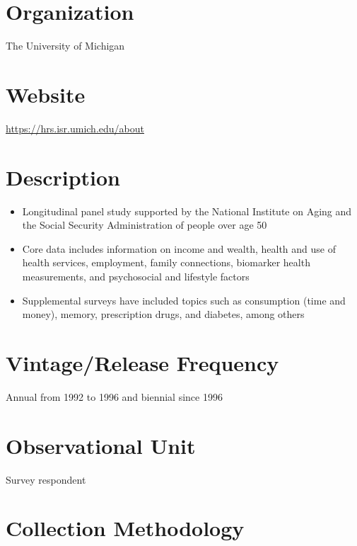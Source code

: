\documentclass[
]{book}
\providecommand{\tightlist}{%
  \setlength{\itemsep}{0pt}\setlength{\parskip}{0pt}}
\begin{document}
\hypertarget{organization-29}{%
\section{Organization}\label{organization-29}}

The University of Michigan

\hypertarget{website-29}{%
\section{Website}\label{website-29}}

\url{https://hrs.isr.umich.edu/about}

\hypertarget{description-29}{%
\section{Description}\label{description-29}}

\begin{itemize}
\tightlist
\item
  Longitudinal panel study supported by the National Institute on Aging and the Social Security Administration of people over age 50
\item
  Core data includes information on income and wealth, health and use of health services, employment, family connections, biomarker health measurements, and psychosocial and lifestyle factors
\item
  Supplemental surveys have included topics such as consumption (time and money), memory, prescription drugs, and diabetes, among others
\end{itemize}

\hypertarget{vintagerelease-frequency-29}{%
\section{Vintage/Release Frequency}\label{vintagerelease-frequency-29}}

Annual from 1992 to 1996 and biennial since 1996

\hypertarget{observational-unit-29}{%
\section{Observational Unit}\label{observational-unit-29}}

Survey respondent

\hypertarget{collection-methodology-29}{%
\section{Collection Methodology}\label{collection-methodology-29}}
\end{document}
